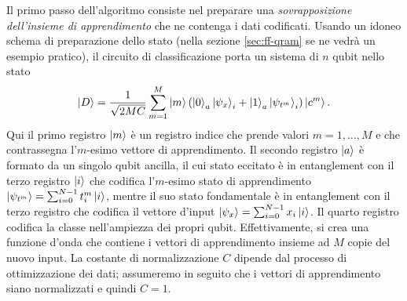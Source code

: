 

Il primo passo dell'algoritmo consiste nel preparare una 
\emph{sovrapposizione dell'insieme di apprendimento} che 
ne contenga i dati codificati. 
Usando un idoneo schema di preparazione dello stato (nella sezione \ref{sec:ff-qram} 
se ne vedrà un esempio pratico), 
il circuito di classificazione porta un sistema di $n$ 
qubit nello stato 
\begin{equation}
    \ket{D} = \frac{1}{\sqrt{2MC}} \sum_{m=1}^M \ket{m} 
    \left( \ket{0}_a\ket{\psi_x}_i + \ket{1}_a\ket{\psi_{t^m}}_i \right)
    \ket{c^m}.
\end{equation}
Qui il primo registro $\ket{m}$ è un registro indice che prende valori 
$m=1,\ldots,M$ e che contrassegna l'$m$-esimo vettore 
di apprendimento. 
Il secondo registro $\ket{a}$ è formato da un singolo qubit ancilla, il cui 
stato eccitato è in entanglement con il terzo registro $\ket{i}$
che codifica l'$m$-esimo stato di apprendimento 
$\ket{\psi_{t^m}} = \sum_{i=0}^{N-1} t_i^m \ket{i}$, 
mentre il suo stato fondamentale è in entanglement con 
il terzo registro che codifica il vettore d'input 
$\ket{\psi_x} = \sum_{i=0}^{N-1} x_i \ket{i}$. 
Il quarto registro codifica la classe nell'ampiezza dei propri qubit. 
Effettivamente, si crea una funzione d'onda che contiene 
i vettori di apprendimento insieme ad $M$ copie del nuovo 
input. La costante di normalizzazione $C$ dipende dal 
processo di ottimizzazione dei dati; 
assumeremo in seguito che i vettori di apprendimento siano 
normalizzati e quindi $C=1$. 

